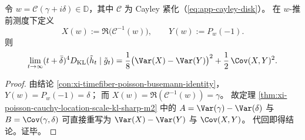 \begin{corollary}\label{cor:xi-poisson-cauchy-location-scale-busemann-rewrite}
令 \(w=\mathcal C(\gamma+i\delta)\in\mathbb D\)，其中 \(\mathcal C\) 为 Cayley 紧化（\eqref{eq:app-cayley-disk}）。
在 \(w\)-推前测度下定义
\[
X(w):=\Re\!\bigl(\mathcal C^{-1}(w)\bigr),\qquad
Y(w):=P_w(-1).
\]
则
\[
\lim_{t\to\infty}(t+\bar\delta)^4 D_{\mathrm{KL}}(\tilde h_t\mid \tilde g_t)
=\frac18\bigl(\Var(X)-\Var(Y)\bigr)^2+\frac12\,\Cov(X,Y)^2.
\]
\end{corollary}

\begin{proof}
由结论 \ref{con:xi-timefiber-poisson-busemann-identity}，
\(
Y(w)=P_w(-1)=\delta
\)；
而
\(
X(w)=\Re(\mathcal C^{-1}(w))=\gamma
\)。
故定理 \ref{thm:xi-poisson-cauchy-location-scale-kl-sharp-m2} 中的
\(
A=\Var(\gamma)-\Var(\delta)
\) 与
\(
B=\Cov(\gamma,\delta)
\)
可直接重写为
\(
\Var(X)-\Var(Y)
\) 与
\(
\Cov(X,Y)
\)。
代回即得结论。证毕。
\end{proof}

